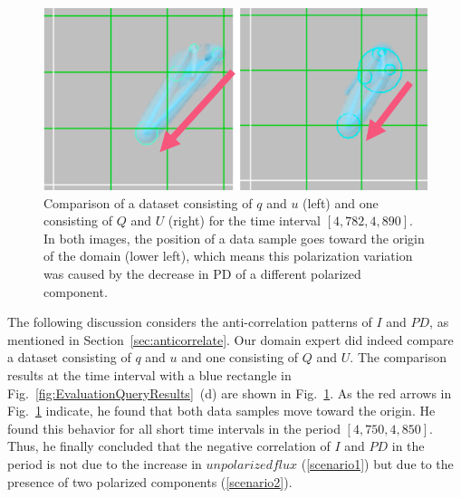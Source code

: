 \begin{figure}[tb]
    \centering
    \includegraphics[width=.8\linewidth]{vgtc_journal_latex/figures/stokesComparisonLabel.png}
    \caption{Comparison of a dataset consisting of $q$ and $u$ (left) and one consisting of $Q$ and $U$ (right) for the time interval $[4{,}782, 4{,}890]$.
    In both images, the position of a data sample goes toward the origin of the domain (lower left), which means this polarization variation was caused by the decrease in PD of a different polarized component.}
    \label{fig:comparisonQIUIvsQU}
\end{figure}

The following discussion considers the anti-correlation patterns of $I$ and $PD$, as mentioned in Section~\ref{sec:anticorrelate}.
Our domain expert did indeed compare a dataset consisting of $q$ and $u$ and one consisting of $Q$ and $U$. The comparison results at the time interval with a blue rectangle in Fig.~\ref{fig:EvaluationQueryResults}~(d) are shown in Fig.~\ref{fig:comparisonQIUIvsQU}.
As the red arrows in Fig.~\ref{fig:comparisonQIUIvsQU} indicate, 
he found that both data samples move toward the origin.
He found this behavior for all short time intervals in the period $[4{,}750, 4{,}850]$.
Thus, he finally concluded that the negative correlation of $I$ and $PD$ in the period is not due to the increase in $unpolarized flux$ (\ref{scenario1}) but due to the presence of two polarized components (\ref{scenario2}). 


